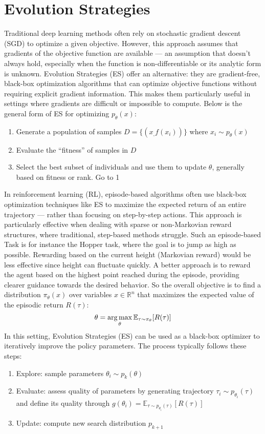 \section{Evolution Strategies}\label{evo_strats}
Traditional deep learning methods often rely on stochastic gradient descent (SGD) to optimize a given objective.
However, this approach assumes that gradients of the objective function are available — an assumption that doesn’t
always hold, especially when the function is non-differentiable or its analytic form is unknown.\newline 
Evolution Strategies (ES) offer an alternative: they are gradient-free, black-box optimization algorithms that can optimize 
objective functions without requiring explicit gradient information. This makes them particularly useful in settings where 
gradients are difficult or impossible to compute. Below is the general form of ES for optimizing $p_\theta(x)$:
\begin{enumerate}
    \item Generate a population of samples $D = \{(x_,f(x_i))\}$ where $x_i \sim p_\theta(x)$
    \item Evaluate the “fitness” of samples in $D$
    \item Select the best subset of individuals and use them to update $\theta$, generally based on fitness or rank. Go
    to 1
\end{enumerate}
In reinforcement learning (RL), episode-based algorithms often use black-box optimization techniques like ES to maximize the 
expected return of an entire trajectory — rather than focusing on step-by-step actions. This approach is particularly 
effective when dealing with sparse or non-Markovian reward structures, where traditional, step-based methods struggle.
Such an episode-based Task is for instance the Hopper task, where the goal is to jump as high as possible. Rewarding based on 
the current height (Markovian reward) would be less effective since height can fluctuate quickly. A better approach is to 
reward the agent based on the highest point reached during the episode, providing clearer guidance towards the desired 
behavior.\newline 
So the overall objective is to find a distribution $\pi_\theta(x)$ over variables $x\in \mathbb{R}^n$ that maximizes the 
expected value of the episodic return $R(\tau)$:
$$\theta = \operatorname*{arg\,max}\limits_\theta \mathbb{E}_{\tau \sim \pi_\theta }[R(\tau)]$$
In this setting, Evolution Strategies (ES) can be used as a black-box optimizer to iteratively improve the policy parameters. 
The process typically follows these steps:
\begin{enumerate}
    \item Explore: sample parameters $\theta_i \sim p_k(\theta)$
    \item Evaluate: assess quality of parameters by generating trajectory $\tau_i \sim p_{\theta_i}(\tau) $ and define its quality through $g(\theta_i) = \mathbb{E}_{\tau \sim p_{\theta_i}(\tau)}[R(\tau)]$ 
    \item Update: compute new search distribution $p_{k+1}$
\end{enumerate}

